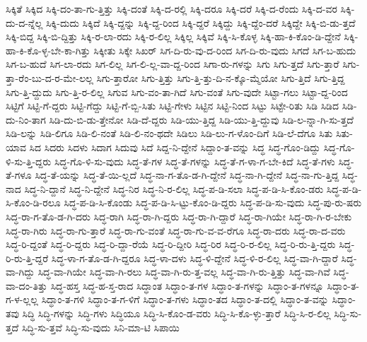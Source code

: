 {ಸಿಕ್ಕಿತೆ
ಸಿಕ್ಕಿದ
ಸಿಕ್ಕಿ-ದಂ-ತಾ-ಗು-ತ್ತಿತ್ತು
ಸಿಕ್ಕಿ-ದಂತೆ
ಸಿಕ್ಕಿ-ದ-ರಲ್ಲಿ
ಸಿಕ್ಕಿ-ದರೂ
ಸಿಕ್ಕಿ-ದರೆ
ಸಿಕ್ಕಿ-ದ-ರೆಂದು
ಸಿಕ್ಕಿ-ದ-ವರ
ಸಿಕ್ಕಿ-ದು-ದ-ನ್ನೆಲ್ಲ
ಸಿಕ್ಕಿ-ದುದು
ಸಿಕ್ಕಿದೆ
ಸಿಕ್ಕಿ-ದ್ದನ್ನು
ಸಿಕ್ಕಿ-ದ್ದ-ರಿಂದ
ಸಿಕ್ಕಿ-ದ್ದರೆ
ಸಿಕ್ಕಿದ್ದು
ಸಿಕ್ಕಿ-ದ್ದೆಂ-ದರೆ
ಸಿಕ್ಕಿದ್ದೇ
ಸಿಕ್ಕಿ-ಬಿ-ಡು-ತ್ತದೆ
ಸಿಕ್ಕಿ-ಬಿದ್ದ
ಸಿಕ್ಕಿ-ಬಿ-ದ್ದಿತ್ತು
ಸಿಕ್ಕಿ-ರ-ಲಾ-ರದು
ಸಿಕ್ಕಿ-ರ-ಲಿಲ್ಲ
ಸಿಕ್ಕಿಲ್ಲ
ಸಿಕ್ಕಿವೆ
ಸಿಕ್ಕಿ-ಸಿ-ಕೊಳ್ಳ
ಸಿಕ್ಕಿ-ಹಾ-ಕಿ-ಕೊಂ-ಡಿ-ದ್ದೇನೆ
ಸಿಕ್ಕಿ-ಹಾ-ಕಿ-ಕೊ-ಳ್ಳ-ಬೇ-ಕಾ-ಗಿತ್ತು
ಸಿಕ್ಕೀತು
ಸಿಕ್ಕೇ
ಸಿಖರ್
ಸಿಗ-ದಿ-ರು-ವು-ದ-ರಿಂದ
ಸಿಗ-ದಿ-ರು-ವುದು
ಸಿಗದೆ
ಸಿಗ-ಬ-ಹುದು
ಸಿಗ-ಬ-ಹುದೆ
ಸಿಗ-ಲಾ-ರದು
ಸಿಗ-ಲಿಲ್ಲ
ಸಿಗ-ಲಿ-ಲ್ಲ-ವಾ-ದ್ದ-ರಿಂದ
ಸಿಗಾ-ರು-ಗಳನ್ನು
ಸಿಗು
ಸಿಗು-ತ್ತದೆ
ಸಿಗು-ತ್ತಾರೆ
ಸಿಗು-ತ್ತಾ-ರೆಂ-ಬು-ದ-ರ-ಮೇ-ಲಲ್ಲ
ಸಿಗು-ತ್ತಾರೋ
ಸಿಗು-ತ್ತಿತ್ತು
ಸಿಗು-ತ್ತಿ-ತ್ತು-ದಿ-ನ-ಕ್ಕೊ-ಮ್ಮೆಯೋ
ಸಿಗು-ತ್ತಿದೆ
ಸಿಗು-ತ್ತಿದ್ದ
ಸಿಗು-ತ್ತಿ-ದ್ದುದು
ಸಿಗು-ತ್ತಿ-ರ-ಲಿಲ್ಲ
ಸಿಗುವ
ಸಿಗು-ವಂ-ತಾ-ಗಿದೆ
ಸಿಗು-ವಂತೆ
ಸಿಗು-ವುದೇ
ಸಿಟ್ಟಾ-ಗಲು
ಸಿಟ್ಟಾ-ದ್ದ-ರಿಂದ
ಸಿಟ್ಟಿಗೆ
ಸಿಟ್ಟಿ-ಗೆ-ದ್ದರು
ಸಿಟ್ಟಿ-ಗೆದ್ದು
ಸಿಟ್ಟಿ-ಗೆ-ಬ್ಬಿ-ಸಿತು
ಸಿಟ್ಟಿ-ಗೇಳು
ಸಿಟ್ಟಿನ
ಸಿಟ್ಟಿ-ನಿಂದ
ಸಿಟ್ಟು
ಸಿಟ್ಟೇ-ರಿತು
ಸಿಡಿ
ಸಿಡಿದ
ಸಿಡಿ-ದು-ನಿಂ-ತಾಗ
ಸಿಡಿ-ದು-ಬಿ-ಡು-ತ್ತೇನೋ
ಸಿಡಿ-ದೆ-ದ್ದರು
ಸಿಡಿ-ಯು-ತ್ತಿದ್ದ
ಸಿಡಿ-ಯು-ತ್ತಿ-ದ್ದುವು
ಸಿಡಿ-ಲ-ನ್ನಾ-ಗಿ-ಸು-ತ್ತದೆ
ಸಿಡಿ-ಲನ್ನು
ಸಿಡಿ-ಲಿಗೂ
ಸಿಡಿ-ಲಿ-ನಂತೆ
ಸಿಡಿ-ಲಿ-ನಂ-ಥದೇ
ಸಿಡಿಲು
ಸಿಡಿ-ಲು-ಗ-ಳೊಂ-ದಿಗೆ
ಸಿಡಿ-ಲೆ-ದೆಗೂ
ಸಿತು
ಸಿತು-ಯಾವ
ಸಿದ
ಸಿದರು
ಸಿದಳು
ಸಿದಾಗ
ಸಿದುವು
ಸಿದೆ
ಸಿದ್ದ-ನಿ-ದ್ದೇನೆ
ಸಿದ್ದಾಂ-ತ-ವನ್ನು
ಸಿದ್ಧ
ಸಿದ್ಧ-ಗೊಂ-ಡಿದ್ದು
ಸಿದ್ಧ-ಗೊ-ಳಿ-ಸು-ತ್ತಿ-ದ್ದರು
ಸಿದ್ಧ-ಗೊ-ಳಿ-ಸು-ವುದು
ಸಿದ್ಧ-ತೆ-ಗಳ
ಸಿದ್ಧ-ತೆ-ಗಳನ್ನು
ಸಿದ್ಧ-ತೆ-ಗ-ಳಾ-ಗ-ಬೇ-ಕಿದೆ
ಸಿದ್ಧ-ತೆ-ಗಳು
ಸಿದ್ಧ-ತೆ-ಗಳೂ
ಸಿದ್ಧ-ತೆ-ಯನ್ನು
ಸಿದ್ಧ-ತೆ-ಯಿ-ಲ್ಲದೆ
ಸಿದ್ಧ-ನಾ-ಗ-ತೊ-ಡ-ಗಿ-ದ್ದೇನೆ
ಸಿದ್ಧ-ನಾ-ಗಿ-ದ್ದೇನೆ
ಸಿದ್ಧ-ನಾ-ಗು-ತ್ತಿದ್ದ
ಸಿದ್ಧ-ನಾದ
ಸಿದ್ಧ-ನಿ-ದ್ದಾನೆ
ಸಿದ್ಧ-ನಿ-ದ್ದೇನೆ
ಸಿದ್ಧ-ನಿರ
ಸಿದ್ಧ-ನಿ-ರ-ಲಿಲ್ಲ
ಸಿದ್ಧ-ಪ-ಡಿ-ಸಲಾ
ಸಿದ್ಧ-ಪ-ಡಿ-ಸಿ-ಕೊಂ-ಡರು
ಸಿದ್ಧ-ಪ-ಡಿ-ಸಿ-ಕೊಂ-ಡಿ-ರಲೂ
ಸಿದ್ಧ-ಪ-ಡಿ-ಸಿ-ಕೊಂಡು
ಸಿದ್ಧ-ಪ-ಡಿ-ಸಿ-ಟ್ಟು-ಕೊಂ-ಡಿ-ದ್ದರು
ಸಿದ್ಧ-ಪ-ಡಿ-ಸು-ವುದು
ಸಿದ್ಧ-ಪು-ರು-ಷರು
ಸಿದ್ಧ-ರಾ-ಗ-ತೊ-ಡ-ಗಿ-ದರು
ಸಿದ್ಧ-ರಾಗಿ
ಸಿದ್ಧ-ರಾ-ಗಿ-ದ್ದರು
ಸಿದ್ಧ-ರಾ-ಗಿ-ದ್ದಾರೆ
ಸಿದ್ಧ-ರಾ-ಗಿಯೇ
ಸಿದ್ಧ-ರಾ-ಗಿ-ರ-ಬೇಕು
ಸಿದ್ಧ-ರಾ-ಗಿರು
ಸಿದ್ಧ-ರಾ-ಗು-ತ್ತಾರೆ
ಸಿದ್ಧ-ರಾ-ಗು-ವಂತೆ
ಸಿದ್ಧ-ರಾ-ಗು-ವ-ವ-ರೆಗೂ
ಸಿದ್ಧ-ರಾ-ದರು
ಸಿದ್ಧ-ರಾ-ದ-ವರು
ಸಿದ್ಧ-ರಿ-ದ್ದಂತೆ
ಸಿದ್ಧ-ರಿ-ದ್ದರು
ಸಿದ್ಧ-ರಿ-ದ್ದಾ-ರೆಯೆ
ಸಿದ್ಧ-ರಿ-ದ್ದೀರಿ
ಸಿದ್ಧ-ರಿರ
ಸಿದ್ಧ-ರಿ-ರ-ಲಿಲ್ಲ
ಸಿದ್ಧ-ರಿ-ರು-ತ್ತಿ-ದ್ದರು
ಸಿದ್ಧ-ರಿ-ರು-ತ್ತಿ-ದ್ದರೆ
ಸಿದ್ಧ-ಳಾ-ಗ-ತೊ-ಡ-ಗಿ-ದ್ದರೂ
ಸಿದ್ಧ-ಳಾ-ದಳು
ಸಿದ್ಧ-ಳಿ-ದ್ದೇನೆ
ಸಿದ್ಧ-ಳಿ-ರ-ಲಿಲ್ಲ
ಸಿದ್ಧ-ವಾ-ಗಿ-ದ್ದಾರೆ
ಸಿದ್ಧ-ವಾ-ಗಿದ್ದು
ಸಿದ್ಧ-ವಾ-ಗಿಯೇ
ಸಿದ್ಧ-ವಾ-ಗಿ-ರಲು
ಸಿದ್ಧ-ವಾ-ಗಿ-ರು-ತ್ತ-ವಲ್ಲ
ಸಿದ್ಧ-ವಾ-ಗಿ-ರು-ತ್ತಿತ್ತು
ಸಿದ್ಧ-ವಾ-ಗಿವೆ
ಸಿದ್ಧ-ವಾ-ದಂ-ತಿತ್ತು
ಸಿದ್ಧ-ಹಸ್ತ
ಸಿದ್ಧ-ಹ-ಸ್ತ-ರಾದ
ಸಿದ್ಧಾಂತ
ಸಿದ್ಧಾಂ-ತ-ಗಳ
ಸಿದ್ಧಾಂ-ತ-ಗಳನ್ನು
ಸಿದ್ಧಾಂ-ತ-ಗಳನ್ನೂ
ಸಿದ್ಧಾಂ-ತ-ಗ-ಳ-ಲ್ಲಲ್ಲ
ಸಿದ್ಧಾಂ-ತ-ಗಳಿ
ಸಿದ್ಧಾಂ-ತ-ಗ-ಳಿಗೆ
ಸಿದ್ಧಾಂ-ತ-ಗಳು
ಸಿದ್ಧಾಂ-ತದ
ಸಿದ್ಧಾಂ-ತ-ದಲ್ಲಿ
ಸಿದ್ಧಾಂ-ತ-ವನ್ನು
ಸಿದ್ಧಾಂ-ತವು
ಸಿದ್ಧಿ
ಸಿದ್ಧಿ-ಗಳನ್ನು
ಸಿದ್ಧಿ-ಗಳು
ಸಿದ್ಧಿಯೂ
ಸಿದ್ಧಿ-ಸಿ-ಕೊಂ-ಡ-ವರು
ಸಿದ್ಧಿ-ಸಿ-ಕೊ-ಳ್ಳು-ತ್ತಾರೆ
ಸಿದ್ಧಿ-ಸಿ-ರ-ಲಿಲ್ಲ
ಸಿದ್ಧಿ-ಸು-ತ್ತದೆ
ಸಿದ್ಧಿ-ಸು-ತ್ತವೆ
ಸಿದ್ಧಿ-ಸು-ವುದು
ಸಿನಿ-ಮಾ-ಟಿ
ಸಿಪಾಯಿ
}
